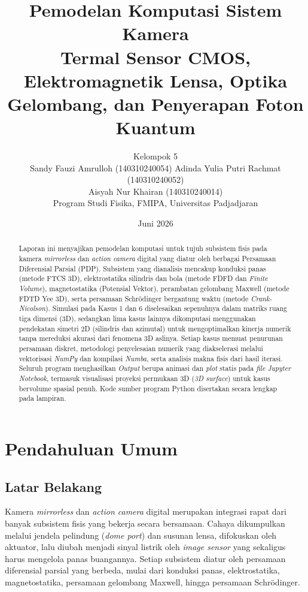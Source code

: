 \documentclass[11pt,a4paper]{article}
\title{%
  \textbf{Pemodelan Komputasi Sistem Kamera}\\[6pt]
  {\large Termal Sensor CMOS, Elektromagnetik Lensa,
          Optika Gelombang, dan Penyerapan Foton Kuantum}%
}
\author{%
  Kelompok 5\\[2pt]
  Sandy Fauzi Amrulloh (140310240054)\quad
  Adinda Yulia Putri Rachmat (140310240052)\\
  Aisyah Nur Khairan (140310240014)\\[4pt]
  {\small Program Studi Fisika, FMIPA, Universitas Padjadjaran}%
}
\date{Juni 2026}
\begin{document}
\maketitle

\begin{abstract}
Laporan ini menyajikan pemodelan komputasi untuk tujuh subsistem fisis pada kamera \textit{mirrorless} dan \textit{action camera} digital yang diatur oleh berbagai Persamaan Diferensial Parsial (PDP). Subsistem yang dianalisis mencakup konduksi panas (metode FTCS 3D), elektrostatika silindris dan bola (metode FDFD dan \textit{Finite Volume}), magnetostatika (Potensial Vektor), perambatan gelombang Maxwell (metode FDTD Yee 3D), serta persamaan Schrödinger bergantung waktu (metode \textit{Crank-Nicolson}). Simulasi pada Kasus 1 dan 6 diselesaikan sepenuhnya dalam matriks ruang tiga dimensi (3D), sedangkan lima kasus lainnya dikomputasi menggunakan pendekatan simetri 2D (silindris dan azimutal) untuk mengoptimalkan kinerja numerik tanpa mereduksi akurasi dari fenomena 3D aslinya. Setiap kasus memuat penurunan persamaan diskret, metodologi penyelesaian numerik yang diakselerasi melalui vektorisasi \textit{NumPy} dan kompilasi \textit{Numba}, serta analisis makna fisis dari hasil iterasi. Seluruh program menghasilkan \textit{Output} berupa animasi dan \textit{plot} statis pada \textit{file} \textit{Jupyter Notebook}, termasuk visualisasi proyeksi permukaan 3D (\textit{3D surface}) untuk kasus bervolume spasial penuh. Kode sumber program Python disertakan secara lengkap pada lampiran.
\end{abstract}
\newpage
\tableofcontents
\newpage
{}
\section{Pendahuluan Umum}

\subsection{Latar Belakang}
Kamera \textit{mirrorless} dan \textit{action camera} digital merupakan integrasi rapat dari banyak subsistem fisis yang bekerja secara bersamaan. Cahaya dikumpulkan melalui jendela pelindung (\textit{dome port}) dan susunan lensa, difokuskan oleh aktuator, lalu diubah menjadi sinyal listrik oleh \textit{image sensor} yang sekaligus harus mengelola panas buangannya. Setiap subsistem diatur oleh persamaan diferensial parsial yang berbeda, mulai dari konduksi panas, elektrostatika, magnetostatika, persamaan gelombang Maxwell, hingga persamaan Schrödinger.
\end{document}
